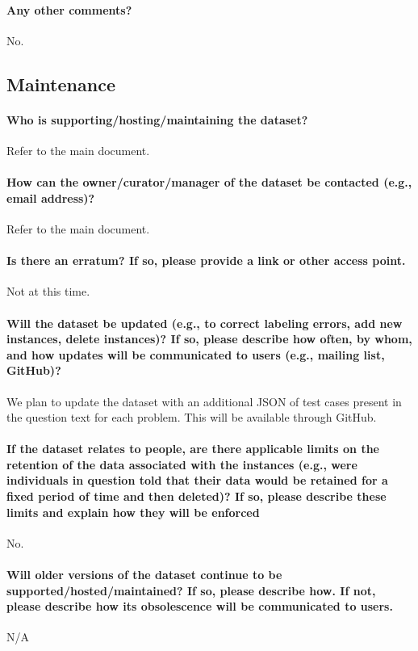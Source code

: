 \paragraph{Any other comments?}
No.

\subsection{Maintenance}
\paragraph{Who is supporting/hosting/maintaining the dataset?}
Refer to the main document.

\paragraph{How can the owner/curator/manager of the dataset be contacted
(e.g., email address)?}
Refer to the main document.

\paragraph{Is there an erratum? If so, please provide a link or other access point.}
Not at this time.

\paragraph{Will the dataset be updated (e.g., to correct labeling errors, add
new instances, delete instances)? If so, please describe how often, by
whom, and how updates will be communicated to users (e.g., mailing list,
GitHub)?}
We plan to update the dataset with an additional JSON of test cases present in the question text for each problem. This will be available through GitHub.

\paragraph{If the dataset relates to people, are there applicable limits on the
retention of the data associated with the instances (e.g., were individuals in question told that their data would be retained for a
fixed period of time and then deleted)? If so, please describe these
limits and explain how they will be enforced}
No.

\paragraph{Will older versions of the dataset continue to be supported/hosted/maintained?
If so, please describe how. If not, please describe how its obsolescence
will be communicated to users.}
N/A

